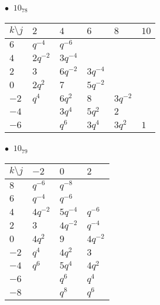 %
\begin{minipage}{\linewidth}
$\bullet\ $ $10_{78}$ \vspace{0.5em} \\
\begin{tabular}{l|lllll}
$k \setminus j$ & $2$ & $4$ & $6$ & $8$ & $10$ \\
\hline
$6$ & $q^{-4}$ & $q^{-6}$ &  &  &  \\
$4$ & $2q^{-2}$ & $3q^{-4}$ &  &  &  \\
$2$ & $3$ & $6q^{-2}$ & $3q^{-4}$ &  &  \\
$0$ & $2q^{2}$ & $7$ & $5q^{-2}$ &  &  \\
$-2$ & $q^{4}$ & $6q^{2}$ & $8$ & $3q^{-2}$ &  \\
$-4$ &  & $3q^{4}$ & $5q^{2}$ & $2$ &  \\
$-6$ &  & $q^{6}$ & $3q^{4}$ & $3q^{2}$ & $1$ \\
\end{tabular}
\vspace{2em}
\end{minipage}
%
\begin{minipage}{\linewidth}
$\bullet\ $ $10_{79}$ \vspace{0.5em} \\
\begin{tabular}{l|lll}
$k \setminus j$ & $-2$ & $0$ & $2$ \\
\hline
$8$ & $q^{-6}$ & $q^{-8}$ &  \\
$6$ & $q^{-4}$ & $q^{-6}$ &  \\
$4$ & $4q^{-2}$ & $5q^{-4}$ & $q^{-6}$ \\
$2$ & $3$ & $4q^{-2}$ & $q^{-4}$ \\
$0$ & $4q^{2}$ & $9$ & $4q^{-2}$ \\
$-2$ & $q^{4}$ & $4q^{2}$ & $3$ \\
$-4$ & $q^{6}$ & $5q^{4}$ & $4q^{2}$ \\
$-6$ &  & $q^{6}$ & $q^{4}$ \\
$-8$ &  & $q^{8}$ & $q^{6}$ \\
\end{tabular}
\vspace{2em}
\end{minipage}
%
